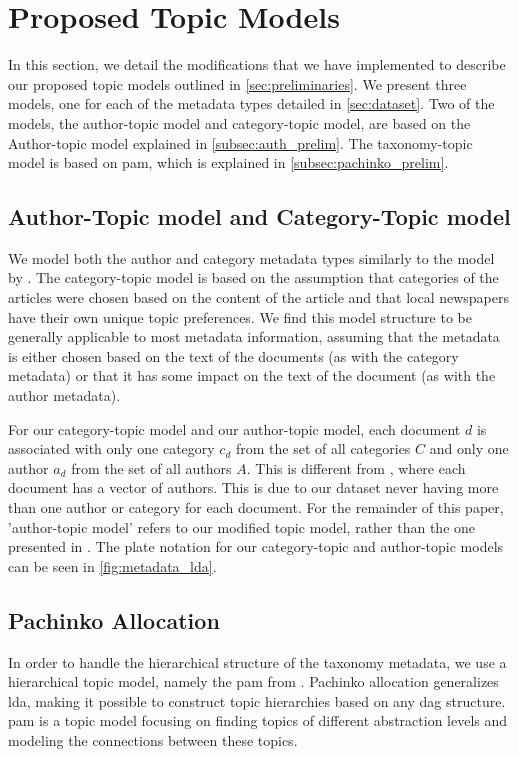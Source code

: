 \section{Proposed Topic Models}\label{sec:plate_notation}
In this section, we detail the modifications that we have implemented to describe our proposed topic models outlined in \autoref{sec:preliminaries}.
We present three models, one for each of the metadata types detailed in \autoref{sec:dataset}.
Two of the models, the author-topic model and category-topic model, are based on the Author-topic model explained in \autoref{subsec:auth_prelim}.
The taxonomy-topic model is based on \gls{pam}, which is explained in \autoref{subsec:pachinko_prelim}.

\subsection{Author-Topic model and Category-Topic model}
We model both the author and category metadata types similarly to the model by \citet{author_topic_2012}.
The category-topic model is based on the assumption that categories of the articles were chosen based on the content of the article and that local newspapers have their own unique topic preferences.
We find this model structure to be generally applicable to most metadata information, assuming that the metadata is either chosen based on the text of the documents (as with the category metadata) or that it has some impact on the text of the document (as with the author metadata).

For our category-topic model and our author-topic model, each document $d$ is associated with only one category $c_d$ from the set of all categories $C$ and only one author $a_d$ from the set of all authors $A$.
This is different from \citet{author_topic_2012}, where each document has a vector of authors.
This is due to our dataset never having more than one author or category for each document.
For the remainder of this paper, 'author-topic model' refers to our modified topic model, rather than the one presented in \citet{author_topic_2012}.
The plate notation for our category-topic and author-topic models can be seen in \autoref{fig:metadata_lda}.

\subsection{Pachinko Allocation}\label{subsec:pam}
In order to handle the hierarchical structure of the taxonomy metadata, we use a hierarchical topic model, namely the \acrfull{pam} from \citet{li2006pachinko}.
Pachinko allocation generalizes \gls{lda}, making it possible to construct topic hierarchies based on any \gls{dag} structure.
\gls{pam} is a topic model focusing on finding topics of different abstraction levels and modeling the connections between these topics.

